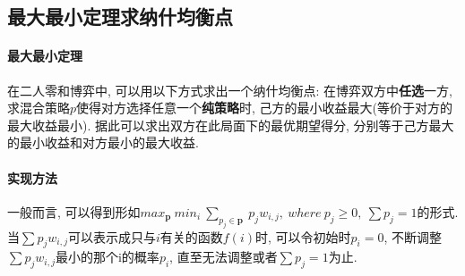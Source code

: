 \subsection{最大最小定理求纳什均衡点}
\paragraph{最大最小定理} 在二人零和博弈中, 可以用以下方式求出一个纳什均衡点: 在博弈双方中\textbf{任选}一方, 求混合策略$p$使得对方选择任意一个\textbf{纯策略}时, 己方的最小收益最大(等价于对方的最大收益最小). 据此可以求出双方在此局面下的最优期望得分, 分别等于己方最大的最小收益和对方最小的最大收益.\\
\paragraph{实现方法} 一般而言, 可以得到形如$max_{\textbf{p}}\ min_i\ \sum_{p_j\in \textbf{p}}\ p_jw_{i,j},\ where\ p_j\ge 0,\ \sum p_j=1$的形式. 当$\sum p_jw_{i,j}$可以表示成只与$i$有关的函数$f(i)$时, 可以令初始时$p_i=0$, 不断调整$\sum p_jw_{i,j}$最小的那个i的概率$p_i$, 直至无法调整或者$\sum p_j=1$为止.
